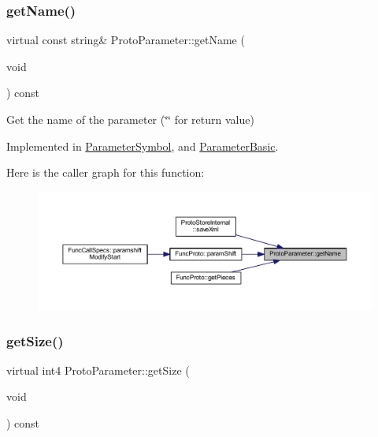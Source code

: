 \subsubsection{\texorpdfstring{getName()}{getName()}}
{\footnotesize\ttfamily virtual const string\& Proto\+Parameter\+::get\+Name (\begin{DoxyParamCaption}\item[{void}]{ }\end{DoxyParamCaption}) const\hspace{0.3cm}{\ttfamily [pure virtual]}}



Get the name of the parameter (\char`\"{}\char`\"{} for return value) 



Implemented in \mbox{\hyperlink{class_parameter_symbol_ad0e7cd03c77c5c514b980a0410547c7c}{Parameter\+Symbol}}, and \mbox{\hyperlink{class_parameter_basic_aa8bfb0e008ccc1953627e5415e64fadb}{Parameter\+Basic}}.

Here is the caller graph for this function\+:
\nopagebreak
\begin{figure}[H]
\begin{center}
\leavevmode
\includegraphics[width=350pt]{class_proto_parameter_a03d8c36596d1564b5366295ff63fc182_icgraph}
\end{center}
\end{figure}
\mbox{\label{class_proto_parameter_a910cfb9ed6ce57e9bf6e9789b8ed3e0f}} 
\subsubsection{\texorpdfstring{getSize()}{getSize()}}
{\footnotesize\ttfamily virtual int4 Proto\+Parameter\+::get\+Size (\begin{DoxyParamCaption}\item[{void}]{ }\end{DoxyParamCaption}) const\hspace{0.3cm}{\ttfamily [pure virtual]}}



